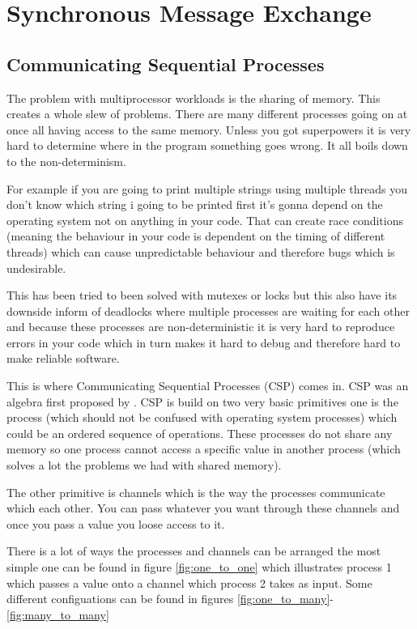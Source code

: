 \chapter{Synchronous Message Exchange}

\section{Communicating Sequential Processes}  
    The problem with multiprocessor workloads is the sharing of memory. This creates a whole slew of problems. There are many different processes going on at once all having access to the same memory. Unless you got superpowers it is very hard to determine where in the program something goes wrong. It all boils down to the non-determinism. 
    
    For example if you are going to print multiple strings using multiple threads you don't know which string i going to be printed first it's gonna depend on the operating system not on anything in your code. That can create race conditions (meaning the behaviour in your code is dependent on the timing of different threads) which can cause unpredictable behaviour and therefore bugs which is undesirable.
    
    This has been tried to been solved with mutexes or locks but this also have its downside inform of deadlocks where multiple processes are waiting for each other and because these processes are non-deterministic it is very hard to reproduce errors in your code which in turn makes it hard to debug and therefore hard to make reliable software.
    
    This is where Communicating Sequential Processes (CSP) comes in. CSP was an algebra first proposed by \citet{HoareC1978Csp}.
    CSP is build on two very basic primitives one is the process (which should not be confused with operating system processes) which could be an ordered sequence of operations. These processes do not share any memory so one process cannot access a specific value in another process (which solves a lot the problems we had with shared memory).
    
    The other primitive is channels which is the way the processes communicate which each other. You can pass whatever you want through these channels and once you pass a value you loose access to it.
    
    There is a lot of ways the processes and channels can be arranged the most simple one can be found in figure \ref{fig:one_to_one} which illustrates process 1 which passes a value onto a channel which process 2 takes as input. Some different configuations can be found in figures \ref{fig:one_to_many}-\ref{fig:many_to_many}
    
